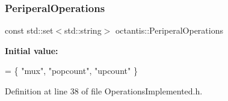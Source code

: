 \subsubsection{\texorpdfstring{Periperal\+Operations}{PeriperalOperations}}
{\footnotesize\ttfamily const std\+::set$<$std\+::string$>$ octantis\+::\+Periperal\+Operations}

{\bfseries Initial value\+:}
\begin{DoxyCode}
= \{
    \textcolor{stringliteral}{"mux"},
    \textcolor{stringliteral}{"popcount"},
    \textcolor{stringliteral}{"upcount"}
\}
\end{DoxyCode}


Definition at line 38 of file Operations\+Implemented.\+h.

